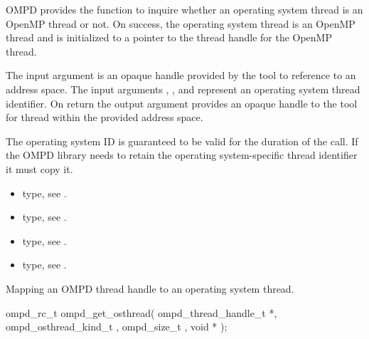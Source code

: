 \descr
OMPD provides the function 
to inquire whether an operating system thread is an OpenMP
thread or not.
On success, the operating
system thread is an OpenMP thread and 
is initialized to a pointer to the thread handle for the OpenMP thread.

\argdesc


The input argument  is an opaque handle provided by the tool
to reference to an address space.
The input arguments ,  , and  represent an operating 
system thread identifier. 
On return the output argument  provides an opaque handle to the
tool for thread within the provided address space.

The operating system ID  is guaranteed to be valid for the duration of the call. If the 
OMPD library needs to retain the operating system-specific thread identifier it must copy it.





\crossreferences
\begin{itemize}
	\item {} type, see .
	\item {} type, see .
	\item {} type, see .
	\item {} type, see .
\end{itemize}

\label{ompd:ompd_get_osthread}
\summary
Mapping an OMPD thread handle to an operating system thread.
\format
\cspecificstart
\begin{boxedcode}
ompd\_rc\_t ompd\_get\_osthread(
  ompd\_thread\_handle\_t *, 
  ompd\_osthread\_kind\_t , 
  ompd\_size\_t , 
  void  * 
);
\end{boxedcode}
\cspecificend

